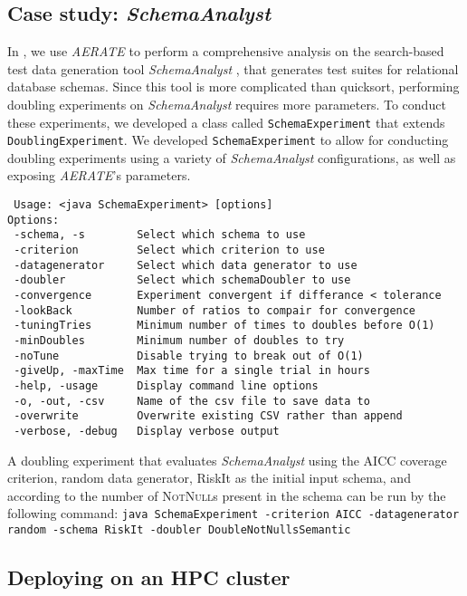 \documentclass[10pt,twocolumn]{article}
\begin{document}
    \subsection{Case study: \textit{SchemaAnalyst}}
    In \cite{kinneer2015}, we use \textit{AERATE} to perform a
    comprehensive analysis on the search-based test data generation 
    tool \textit{SchemaAnalyst} \cite{kapfhammer2013}, that generates
    test suites for relational database schemas. Since this tool is more
    complicated than quicksort, performing doubling experiments on
    \textit{SchemaAnalyst} requires more parameters.  To conduct these
    experiments, we developed a class called \texttt{SchemaExperiment}
    that extends \texttt{DoublingExperiment}.  We developed 
    \texttt{SchemaExperiment} to allow for conducting doubling
    experiments using a variety of \textit{SchemaAnalyst} configurations,
    as well as exposing \textit{AERATE}'s parameters.
{\scriptsize
\begin{verbatim}
 Usage: <java SchemaExperiment> [options]
Options:  
 -schema, -s        Select which schema to use 
 -criterion         Select which criterion to use 
 -datagenerator     Select which data generator to use 
 -doubler           Select which schemaDoubler to use 
 -convergence       Experiment convergent if differance < tolerance 
 -lookBack          Number of ratios to compair for convergence 
 -tuningTries       Minimum number of times to doubles before O(1)  
 -minDoubles        Minimum number of doubles to try 
 -noTune            Disable trying to break out of O(1) 
 -giveUp, -maxTime  Max time for a single trial in hours 
 -help, -usage      Display command line options 
 -o, -out, -csv     Name of the csv file to save data to 
 -overwrite         Overwrite existing CSV rather than append 
 -verbose, -debug   Display verbose output 
\end{verbatim}
}

    A doubling experiment that evaluates \textit{SchemaAnalyst} using
    the AICC coverage criterion, random data generator, RiskIt as the initial input
    schema, and according to the number of \textsc{NotNull}s present in the
    schema can be run by the following command:
    \texttt{java SchemaExperiment -criterion AICC -datagenerator random -schema RiskIt -doubler DoubleNotNullsSemantic}
    \subsection{Deploying on an HPC cluster}
\end{document}
